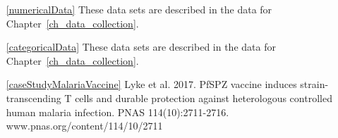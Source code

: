 
\begin{itemize}
\item[\ref{numericalData}]
    These data sets are described in
    the data for Chapter~\ref{ch_data_collection}.

\item[\ref{categoricalData}]
    These data sets are described in
    the data for Chapter~\ref{ch_data_collection}.

\item[\ref{caseStudyMalariaVaccine}]
    Lyke et al. 2017.
    PfSPZ vaccine induces strain-transcending T cells
    and durable protection against heterologous controlled
    human malaria infection.
    PNAS 114(10):2711-2716.
        {www.pnas.org/content/114/10/2711}
\end{itemize}








\D{\newpage}

